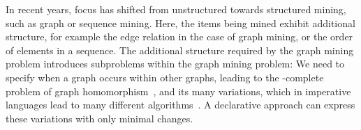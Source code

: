 In recent years, focus has shifted from unstructured towards structured mining, such as graph or sequence mining.
Here, the items being mined exhibit additional structure, for example the edge relation in the case of graph mining, or the order of elements in a sequence.
The additional structure required by the graph mining problem introduces subproblems within the graph mining problem: We need to specify when a graph occurs within other graphs, leading to the \NP-complete problem of graph homomorphism~\citep{Lev73}, and its many variations, which in imperative languages lead to many different algorithms~\citep{gspan,theta_subsumption}.
A declarative approach can express these variations with only minimal changes.

